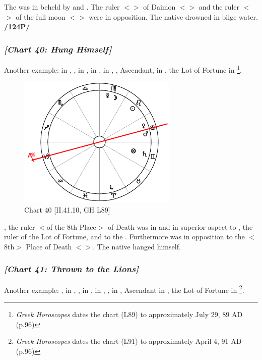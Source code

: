 The \Moon\xspace was in \Pisces\xspace beheld by \Saturn\xspace and \Mars. The ruler $<$\Moon$>$ of Daimon $<$\Cancer$>$ and the ruler $<$\Mars$>$ of the full moon $<$\Scorpio$>$ were in opposition. The native drowned in bilge water. \textbf{/124P/} 
\newpage
\subsubsection{\textit{[Chart 40: Hung Himself]}}
Another example: \Sun\xspace in \Leo, \Moon, \Mercury\xspace in \Virgo, \Saturn\xspace in \Gemini, \Jupiter\xspace in \Aries, \Mars, Ascendant, \Venus\xspace in \Cancer, the Lot of Fortune in \Gemini
\footnote{\textit{Greek Horoscopes} dates the chart (L89) to approximately July 29, 89 AD (p.96)}. 

\clearpage
\begin{figure}
\centering
\vspace{-20pt}
\includegraphics[width=0.68\textwidth]{charts/2_41_10}
\caption{Chart 40 [II.41.10, GH L89]}
\label{fig:chart40}
\end{figure} 

\noindent\Saturn, the ruler $<$of the 8th Place$>$ of Death was in \Gemini\xspace and in superior aspect to \Mercury, the ruler of the Lot of Fortune, and to the \Moon. Furthermore \Mars\xspace was in opposition to the $<$8th$>$ Place of Death $<$\Capricorn$>$. The native hanged himself.
\newpage
\subsubsection{\textit{[Chart 41: Thrown to the Lions]}}
Another example: \Sun, \Mercury\xspace in \Aries, \Moon, \Venus\xspace in \Pisces, \Saturn\xspace in \Cancer, \Jupiter, \Mars\xspace in \Taurus, Ascendant in \Scorpio, the Lot of Fortune in \Sagittarius
\footnote{\textit{Greek Horoscopes} dates the chart (L91) to approximately April 4, 91 AD (p.96)}. 

